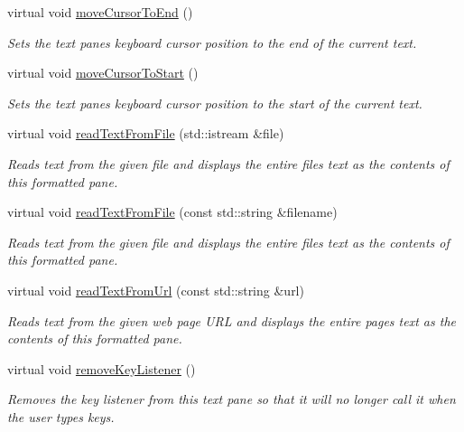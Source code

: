 \begin{DoxyCompactItemize}
virtual void \mbox{\hyperlink{classGBrowserPane_ab5ef729cac166db0ef51ff7ea30d1bb8}{move\+Cursor\+To\+End}} ()
\begin{DoxyCompactList}\small\item\em Sets the text pane\textquotesingle{}s keyboard cursor position to the end of the current text. \end{DoxyCompactList}\item 
virtual void \mbox{\hyperlink{classGBrowserPane_a24abdceab57bcff96185afbadf193a22}{move\+Cursor\+To\+Start}} ()
\begin{DoxyCompactList}\small\item\em Sets the text pane\textquotesingle{}s keyboard cursor position to the start of the current text. \end{DoxyCompactList}\item 
virtual void \mbox{\hyperlink{classGBrowserPane_a5e6d9158a9311204ca49518c32072ce0}{read\+Text\+From\+File}} (std\+::istream \&file)
\begin{DoxyCompactList}\small\item\em Reads text from the given file and displays the entire file\textquotesingle{}s text as the contents of this formatted pane. \end{DoxyCompactList}\item 
virtual void \mbox{\hyperlink{classGBrowserPane_a58c4154aa0c23bc980d45bf9de7cc95c}{read\+Text\+From\+File}} (const std\+::string \&filename)
\begin{DoxyCompactList}\small\item\em Reads text from the given file and displays the entire file\textquotesingle{}s text as the contents of this formatted pane. \end{DoxyCompactList}\item 
virtual void \mbox{\hyperlink{classGBrowserPane_a68ff415e722130964bc9e1de826f4869}{read\+Text\+From\+Url}} (const std\+::string \&url)
\begin{DoxyCompactList}\small\item\em Reads text from the given web page U\+RL and displays the entire page\textquotesingle{}s text as the contents of this formatted pane. \end{DoxyCompactList}\item 
virtual void \mbox{\hyperlink{classGBrowserPane_a43095f41cab3be732b49f29970484b05}{remove\+Key\+Listener}} ()
\begin{DoxyCompactList}\small\item\em Removes the key listener from this text pane so that it will no longer call it when the user types keys. \end{DoxyCompactList}\item 

\end{DoxyCompactItemize}
